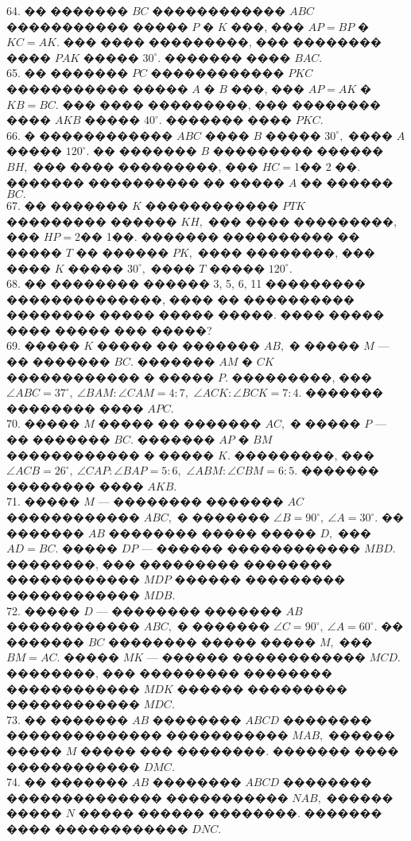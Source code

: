 \documentclass[12pt]{article}
\begin{document}
64. �� ������� $BC$ ������������ $ABC$ ����������� ����� $P$ � $K$ ���, ��� $AP=BP$ � $KC=AK.$ ��� ���� ���������, ��� �������� ���� $PAK$ ����� $30^\circ.$ ������� ���� $BAC.$\\
65. �� ������� $PC$ ������������ $PKC$ ����������� ����� $A$ � $B$ ���, ��� $AP=AK$ � $KB=BC.$ ��� ���� ���������, ��� �������� ���� $AKB$ ����� $40^\circ.$ ������� ���� $PKC.$\\
66. � ������������ $ABC$ ���� $B$ ����� $30^\circ,$ ���� $A$ ����� $120^\circ.$ �� ������� $B$ ��������� ������ $BH,$ ��� ���� ���������, ��� $HC=$1�� 2 ��. ������� ���������� �� ����� $A$ �� ������ $BC.$\\
67. �� ������� $K$ ������������ $PTK$ ��������� ������ $KH,$ ��� ���� ���������, ��� $HP=$2�� 1��. ������� ���������� �� ����� $T$ �� ������ $PK,$ ���� ��������, ��� ���� $K$ ����� $30^\circ,$ ���� $T$ ����� $120^\circ.$\\
68. �� �������� ������ 3, 5, 6, 11 ��������� ��������������, ���� �� ���������� �������� ����� ����� �����. ���� ����� ���� ����� ��� �����?\\
69. ����� $K$ ����� �� ������� $AB,$ � ����� $M$ --- �� ������� $BC.$ ������� $AM$ � $CK$ ������������ � ����� $P.$ ���������, ��� $\angle ABC=37^\circ,\ \angle BAM : \angle CAM=4:7,$ $\angle ACK: \angle BCK=7:4.$ ������� �������� ���� $APC.$\\
70. ����� $M$ ����� �� ������� $AC,$ � ����� $P$ --- �� ������� $BC.$ ������� $AP$ � $BM$ ������������ � ����� $K.$ ���������, ��� $\angle ACB=26^\circ,\ \angle CAP : \angle BAP=5:6,$ $\angle ABM: \angle CBM=6:5.$ ������� �������� ���� $AKB.$\\
71. ����� $M$ --- �������� ������� $AC$ ������������ $ABC,$ � ������� $\angle B=90^\circ,\ \angle A=30^{\circ}.$ �� ������� $AB$ �������� ����� ����� $D,$ ��� $AD=BC.$ ����� $DP$ --- ������ ������������ $MBD.$ ��������, ��� ��������� �������� ������������ $MDP$ ������ ��������� ������������ $MDB.$\\
72. ����� $D$ --- �������� ������� $AB$ ������������ $ABC,$ � ������� $\angle C=90^{\circ},\ \angle A=60^{\circ}.$ �� ������� $BC$ �������� ����� ����� $M,$ ��� $BM=AC.$ ����� $MK$ --- ������ ������������ $MCD.$ ��������, ��� ��������� �������� ������������ $MDK$ ������ ��������� ������������ $MDC.$\\
73. �� ������� $AB$ �������� $ABCD$ �������� �������������� ����������� $MAB,$ ������ ����� $M$ ����� ��� ��������. ������� ���� ������������ $DMC.$\\
74. �� ������� $AB$ �������� $ABCD$ �������� �������������� ����������� $NAB,$ ������ ����� $N$ ����� ������ ��������. ������� ���� ������������ $DNC.$\\
\end{document}
